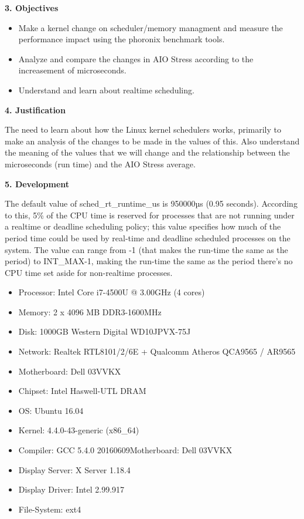 \documentclass[english]{article}
\begin{document}
\vspace{4cm}
\begin{center}
{\bf 3. Objectives}
\end{center}

\begin{itemize}
\item Make a kernel change on scheduler/memory managment and measure the performance impact using the phoronix benchmark tools.
\item Analyze and compare the changes in AIO Stress according to the increasement of microseconds.
\item Understand and learn about realtime scheduling.
\end{itemize}

\vspace{1cm}
\begin{center}
{\bf 4. Justification}
\end{center}

The need to learn about how the Linux kernel schedulers works, primarily to make an analysis of the changes to be made in the values of this. Also understand the meaning of the values that we will change and the relationship between the microseconds (run time) and the AIO Stress average.

\vspace{1cm}
\begin{center}
{\bf 5. Development}
\end{center}

The default value of sched\_rt\_runtime\_us is 950000µs (0.95 seconds). According to this, 5\% of the CPU time is reserved for processes that are not running under a realtime or deadline scheduling policy; this value specifies how much of the period time could be used by real-time and deadline scheduled processes on the system. The value can range from -1 (that makes the run-time the same as the period) to INT\_MAX-1, making the run-time the same as the period there's no CPU time set aside for non-realtime processes.

\vspace{0.5cm}{\bf 5.1 System Specifications}
\begin{itemize}
\item Processor: Intel Core i7-4500U @ 3.00GHz (4 cores)
\item Memory: 2 x 4096 MB DDR3-1600MHz
\item Disk: 1000GB Western Digital WD10JPVX-75J
\item Network: Realtek RTL8101/2/6E + Qualcomm Atheros QCA9565 / AR9565
\item Motherboard: Dell 03VVKX
\item Chipset: Intel Haswell-UTL DRAM
\item OS: Ubuntu 16.04
\item Kernel: 4.4.0-43-generic (x86\_64)
\item Compiler: GCC 5.4.0 20160609Motherboard: Dell 03VVKX
\item Display Server: X Server 1.18.4
\item Display Driver: Intel 2.99.917
\item File-System: ext4
\end{itemize}
\end{document}
